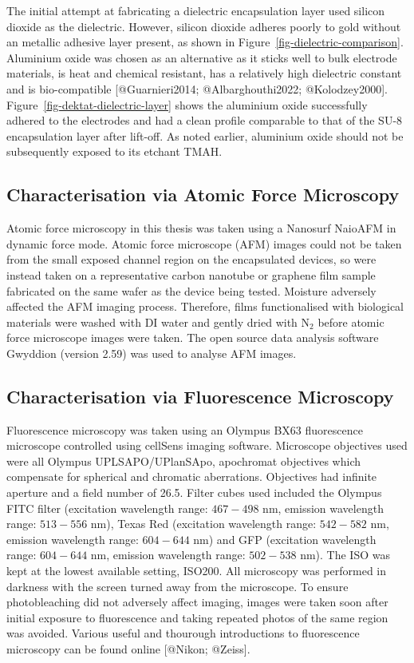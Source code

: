 \documentclass[
  letterpaper,
  DIV=11,
  numbers=noendperiod]{scrartcl}
\begin{document}
The initial attempt at fabricating a dielectric encapsulation layer used
silicon dioxide as the dielectric. However, silicon dioxide adheres
poorly to gold without an metallic adhesive layer present, as shown in
Figure~\ref{fig-dielectric-comparison}. Aluminium oxide was chosen as an
alternative as it sticks well to bulk electrode materials, is heat and
chemical resistant, has a relatively high dielectric constant and is
bio-compatible {[}@Guarnieri2014; @Albarghouthi2022; @Kolodzey2000{]}.
Figure~\ref{fig-dektat-dielectric-layer} shows the aluminium oxide
successfully adhered to the electrodes and had a clean profile
comparable to that of the SU-8 encapsulation layer after lift-off. As
noted earlier, aluminium oxide should not be subsequently exposed to its
etchant TMAH.

\hypertarget{sec-afm-characterisation}{%
\subsection{Characterisation via Atomic Force
Microscopy}\label{sec-afm-characterisation}}

Atomic force microscopy in this thesis was taken using a Nanosurf
NaioAFM in dynamic force mode. Atomic force microscope (AFM) images
could not be taken from the small exposed channel region on the
encapsulated devices, so were instead taken on a representative carbon
nanotube or graphene film sample fabricated on the same wafer as the
device being tested. Moisture adversely affected the AFM imaging
process. Therefore, films functionalised with biological materials were
washed with DI water and gently dried with N\(_2\) before atomic force
microscope images were taken. The open source data analysis software
Gwyddion (version 2.59) was used to analyse AFM images.

\hypertarget{sec-fluorescence-characterisation}{%
\subsection{Characterisation via Fluorescence
Microscopy}\label{sec-fluorescence-characterisation}}

Fluorescence microscopy was taken using an Olympus BX63 fluorescence
microscope controlled using cellSens imaging software. Microscope
objectives used were all Olympus UPLSAPO/UPlanSApo, apochromat
objectives which compensate for spherical and chromatic aberrations.
Objectives had infinite aperture and a field number of 26.5. Filter
cubes used included the Olympus FITC filter (excitation wavelength
range: \(467-498\) nm, emission wavelength range: \(513-556\) nm), Texas
Red (excitation wavelength range: \(542-582\) nm, emission wavelength
range: \(604-644\) nm) and GFP (excitation wavelength range: \(604-644\)
nm, emission wavelength range: \(502-538\) nm). The ISO was kept at the
lowest available setting, ISO200. All microscopy was performed in
darkness with the screen turned away from the microscope. To ensure
photobleaching did not adversely affect imaging, images were taken soon
after initial exposure to fluorescence and taking repeated photos of the
same region was avoided. Various useful and thourough introductions to
fluorescence microscopy can be found online {[}@Nikon; @Zeiss{]}.
\end{document}

